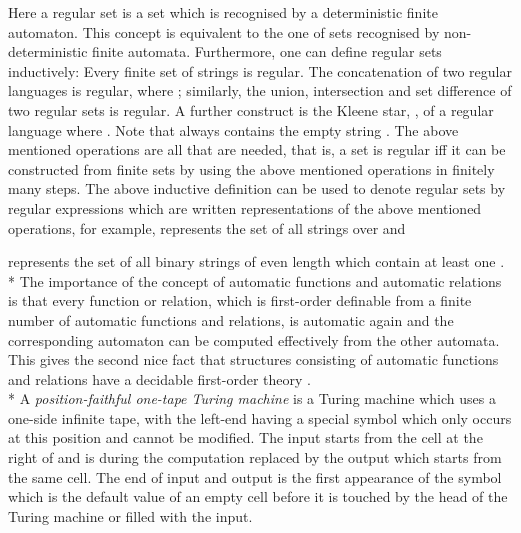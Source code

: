\documentclass{LMCS}
\theoremstyle{plain}\newtheorem{athm}[thm]{Theorem}
\theoremstyle{plain}\newtheorem{aprop}[thm]{Proposition}
\theoremstyle{plain}\newtheorem{aprob}[thm]{Open Problem}
\theoremstyle{plain}\newtheorem{acor}[thm]{Corollary}
\theoremstyle{plain}\newtheorem{alem}[thm]{Lemma}
\theoremstyle{definition}\newtheorem{adefn}[thm]{Definition}
\theoremstyle{definition}\newtheorem{arem}[thm]{Remark}
\theoremstyle{plain}\newtheorem{aexmp}[thm]{Example}
\theoremstyle{plain}\newtheorem{aclm}[thm]{Claim}
\def\sp{\\*\indent}
\begin{document}
\noindent
Here a regular set \cite{HMU01} is a set which is recognised by a deterministic
finite automaton. This concept is equivalent to the one of sets
recognised by non-deterministic finite automata. Furthermore,
one can define regular sets inductively:
Every finite set of strings is regular. The concatenation of
two regular languages is regular, where ; similarly, the union, intersection and set difference of
two regular sets is regular. A further construct is the Kleene star,
, of a regular language  where . Note that
 always contains the empty string . 
The above mentioned operations
are all that are needed, that is, a set is regular
iff it can be constructed from finite sets by using the above
mentioned operations in finitely many steps. 
The above inductive definition can be used
to denote regular sets by regular expressions which are written
representations of the above mentioned operations, for example,
 represents the set of all strings over  and

represents the set of all binary strings of even length which
contain at least one .
\sp
The importance of the concept of automatic functions and automatic relations
is that every function or relation,
which is first-order definable from a finite number
of automatic functions and relations, is automatic again and the
corresponding automaton
can be computed effectively from the other automata. This gives the second
nice fact that structures consisting of automatic functions and relations
have a decidable first-order theory \cite{Ho83,KN95}.
\sp
A {\em position-faithful one-tape Turing machine} is a Turing
machine which uses a one-side infinite tape, with the left-end having
a special symbol  which only occurs at this position and cannot
be modified. The input starts from the cell at the right 
of  and is during the computation replaced by the output
which starts from the same cell. The end of input and output is the first
appearance of the symbol  which is the default value of an empty
cell before it is touched by the head of the Turing machine or filled with
the input.
\end{document}
